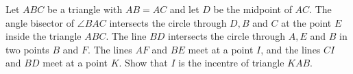 Let 
$ABC$
 be a triangle with 
$AB=AC$
 and let 
$D$
 be the midpoint of 
$AC$.
 The angle bisector of 
$\angle BAC$
 intersects the circle through 
$D,B$
  and 
$C$
 at the point 
$E$
  inside the triangle 
$ABC$.
 The line 
$BD$
 intersects the circle through 
$A,E$
 and 
$B$
 in two points 
$B$
 and 
$F$.
 The lines 
$AF$
 and 
$BE$
 meet at a point 
$I$, 
 and the lines 
$CI$
 and 
$BD$
 meet at a point 
$K$.
 Show that 
$I$
 is the incentre of triangle 
$KAB$.
